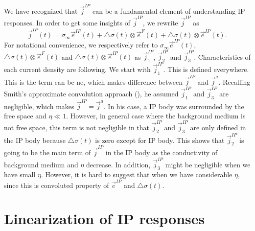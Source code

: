 \documentclass[a4paper, 11pt]{article}
\newcommand{\siginf}{\sigma_\infty}
\newcommand{\dsig}{\triangle\sigma}
\renewcommand {\j}  { {\vec j} }
\newcommand {\e}  { {\vec e} }
\begin{document}
We have recognized that $\j^{IP}$ can be a fundamental element of understanding IP responses. In order to get some insights of $\j^{IP}$, we rewrite $\j^{IP}$ as
\begin{equation}
    \j^{IP}(t) = \siginf\e^{IP}(t) + \dsig(t)\otimes\e^{F}(t)+ \dsig(t)\otimes\e^{IP}(t).
    \label{eq: jip_three}
\end{equation}
For notational convenience, we respectively refer to $\siginf\e^{IP}(t)$, $\dsig(t)\otimes\e^{F}(t)$ and $\dsig(t)\otimes\e^{IP}(t)$ as $\j^{IP}_1$, $\j^{IP}_2$ and $\j^{IP}_3$. Characteristics of each current density are following. We start with $\j^{IP}_1$. This is defined everywhere. This is the term can be ne, which makes difference between $\j^{IP}$ and $\j^a$. Recalling Smith’s approximate convolution approach (\cite{Smith1988a}), he assumed $\j^{IP}_1$ and $\j^{IP}_3$ are negligible, which makes $\j^{IP} = \j^a$. In his case, a IP body was surrounded by the free space and $\eta \ll 1$.  However, in general case where the background medium is not free space, this term is not negligible in that $\j^{IP}_2$ and $\j^{IP}_3$ are only defined in the IP body because $\dsig(t)$ is zero except for IP body. This shows that $\j^{IP}_2$ is going to be the main term of $\j^{IP}$ in the IP body as the conductivity of background medium and $\eta$ decrease. In addition, $\j^{IP}_3$ might be negligible when we have small $\eta$. However, it is hard to suggest that when we have considerable $\eta$, since this is convoluted property of $\e^{IP}$ and $\dsig(t)$.

\section{Linearization of IP responses}
\end{document}
